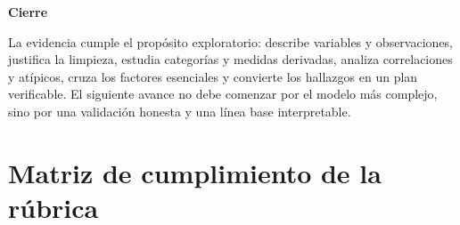 \documentclass[11pt,oneside,openany]{book}
\newenvironment{decision}[1][]{%
  \begin{lrbox}{\infobox}\begin{minipage}{0.92\textwidth}
  \color{GrisTexto}\sffamily\textbf{#1}\par\smallskip\rmfamily}
  {\end{minipage}\end{lrbox}\par\medskip\noindent
   \colorbox{VerdeClaro}{\usebox{\infobox}}\par\medskip}
\begin{document}
\begin{decision}[Cierre]
La evidencia cumple el propósito exploratorio: describe variables y
observaciones, justifica la limpieza, estudia categorías y medidas derivadas,
analiza correlaciones y atípicos, cruza los factores esenciales y convierte los
hallazgos en un plan verificable. El siguiente avance no debe comenzar por el
modelo más complejo, sino por una validación honesta y una línea base
interpretable.
\end{decision}

\appendix

\chapter{Matriz de cumplimiento de la rúbrica}
\end{document}
